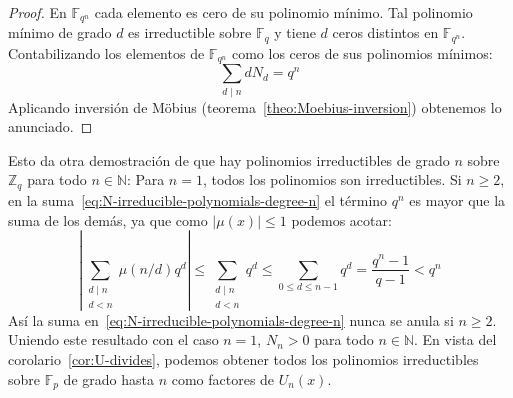  \begin{proof}
    En \(\mathbb{F}_{q^n}\)
    cada elemento es cero de su polinomio mínimo.
    Tal polinomio mínimo de grado \(d\)
    es irreductible sobre \(\mathbb{F}_q\)
    y tiene \(d\) ceros distintos
    en \(\mathbb{F}_{q^n}\).
    Contabilizando los elementos de \(\mathbb{F}_{q^n}\)
    como los ceros de sus polinomios mínimos:
    \begin{equation*}
      \sum_{d \mid n} d N_d
	= q^n
    \end{equation*}
    Aplicando inversión de Möbius%
    (teorema~\ref{theo:Moebius-inversion})
    obtenemos lo anunciado.
  \end{proof}
  Esto da otra demostración
  de que hay polinomios irreductibles de grado \(n\)
  sobre \(\mathbb{Z}_q\) para todo \(n \in \mathbb{N}\):
  Para \(n = 1\),
  todos los polinomios son irreductibles.
  Si \(n \ge 2\),
  en la suma~\eqref{eq:N-irreducible-polynomials-degree-n}
  el término \(q^n\) es mayor que la suma de los demás,
  ya que como \(\lvert \mu(x) \rvert \le 1\) podemos acotar:
  \begin{equation*}
    \left\lvert
      \sum_{\substack{
	      d \mid n \\
	      d < n
	   }} \mu(n / d) q^d
    \right\rvert
      \le \sum_{\substack{
		  d \mid n \\
		  d < n
	       }} q^d
      \le \sum_{0 \le d \le n - 1} q^d
      = \frac{q^n - 1}{q - 1}
      < q^n
  \end{equation*}
  Así la suma en~\eqref{eq:N-irreducible-polynomials-degree-n}
  nunca se anula si \(n \ge 2\).
  Uniendo este resultado con el caso \(n = 1\),
  \(N_n > 0\) para todo \(n \in \mathbb{N}\).
  En vista del corolario~\ref{cor:U-divides},
  podemos obtener todos los polinomios irreductibles
  sobre \(\mathbb{F}_p\)
  de grado hasta \(n\) como factores de \(U_n(x)\).



